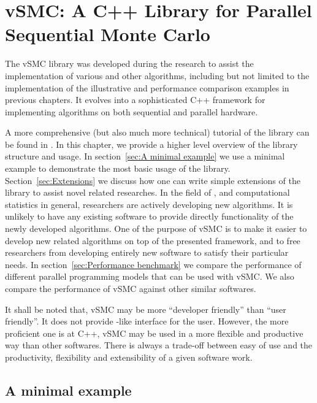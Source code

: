 \chapter{vSMC: A C++ Library for Parallel Sequential Monte Carlo}
\label{cha:vSMC: A C++ Library for Parallel Sequential Monte Carlo}

The vSMC library \cite{software:VSMC} was developed during the research to
assist the implementation of various \smc and other algorithms, including but
not limited to the implementation of the illustrative and performance
comparison examples in previous chapters. It evolves into a sophisticated C++
framework for implementing \smc algorithms on both sequential and parallel
hardware.

A more comprehensive (but also much more technical) tutorial of the library
can be found in \cite{software:VSMC}. In this chapter, we provide a higher
level overview of the library structure and usage. In section~\ref{sec:A
  minimal example} we use a minimal example to demonstrate the most basic
usage of the library. Section~\ref{sec:Extensions} we discuss how one can
write simple extensions of the library to assist novel \smc related
researches. In the field of \smc, and computational statistics in general,
researchers are actively developing new algorithms. It is unlikely to have any
existing software to provide directly functionality of the newly developed
algorithms. One of the purpose of vSMC is to make it easier to develop new
\smc related algorithms on top of the presented framework, and to free
researchers from developing entirely new software to satisfy their particular
needs. In section~\ref{sec:Performance benchmark} we compare the performance
of different parallel programming models that can be used with vSMC. We also
compare the performance of vSMC against other similar softwares.

It shall be noted that, vSMC may be more ``developer friendly'' than ``user
friendly''. It does not provide \bugs-like interface for the user. However,
the more proficient one is at C++, vSMC may be used in a more flexible and
productive way than other softwares. There is always a trade-off between
easy of use and the productivity, flexibility and extensibility of a given
software work.

\section{A minimal example}
\label{sec:A minimal example}

